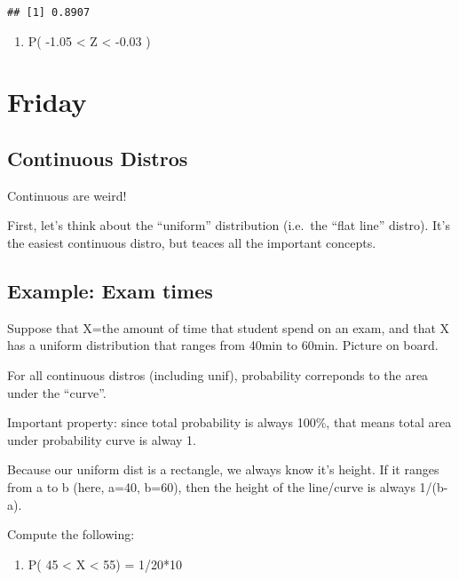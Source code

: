 \documentclass[]{article}
\providecommand{\tightlist}{%
  \setlength{\itemsep}{0pt}\setlength{\parskip}{0pt}}
\begin{document}
\begin{verbatim}
## [1] 0.8907
\end{verbatim}

\begin{enumerate}
\def\labelenumi{\arabic{enumi})}
\setcounter{enumi}{2}
\tightlist
\item
  P( -1.05 \textless{} Z \textless{} -0.03 )
\end{enumerate}

\hypertarget{friday}{%
\section{Friday}\label{friday}}

\hypertarget{continuous-distros-1}{%
\subsection{Continuous Distros}\label{continuous-distros-1}}

Continuous are weird!

First, let's think about the ``uniform'' distribution (i.e.~the ``flat
line'' distro). It's the easiest continuous distro, but teaces all the
important concepts.

\hypertarget{example-exam-times}{%
\subsection{Example: Exam times}\label{example-exam-times}}

Suppose that X=the amount of time that student spend on an exam, and
that X has a uniform distribution that ranges from 40min to 60min.
Picture on board.

For all continuous distros (including unif), probability correponds to
the area under the ``curve''.

Important property: since total probability is always 100\%, that means
total area under probability curve is alway 1.

Because our uniform dist is a rectangle, we always know it's height. If
it ranges from a to b (here, a=40, b=60), then the height of the
line/curve is always 1/(b-a).

Compute the following:

\begin{enumerate}
\def\labelenumi{\arabic{enumi})}
\tightlist
\item
  P( 45 \textless{} X \textless{} 55) = 1/20*10
\end{enumerate}
\end{document}
